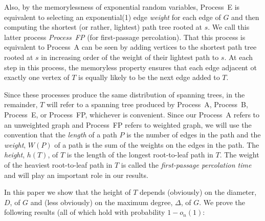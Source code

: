 \documentclass[lotsofwhite]{patmorin}
\begin{document}
Also, by the memorylessness of exponential random variables, Process~E
is equivalent to selecting an exponential(1) edge \emph{weight} for each edge
of $G$ and then computing the shortest (or rather, lightest) path
tree rooted at $s$.  We call this latter process \emph{Process~FP}
(for first-passage percolation).  That this process is equivalent to
Process~A can be seen by adding vertices to the shortest path tree rooted
at $s$ in increasing order of the weight of their lightest path to $s$.
At each step in this process, the memoryless property ensures that each
edge adjacent ot exactly one vertex of $T$ is equally likely to be the
next edge added to $T$.  

Since these processes produce the same distribution of spanning trees,
in the remainder, $T$ will refer to a spanning tree produced by Process~A,
Process~B, Process~E, or Process~FP, whichever is convenient.  Since our
Process~A refers to an unweighted graph and Process~FP refers to weighted
graph, we will use the convention that the \emph{length} of a path $P$ is
the number of edges in the path and the \emph{weight}, $W(P)$ of a path
is the sum of the weights on the edges in the path. The \emph{height},
$h(T)$, of $T$ is the length of the longest root-to-leaf path in $T$.
The weight of the heaviest root-to-leaf path in $T$ is called the
\emph{first-passage percolation time} and will play an important role
in our results.

In this paper we show that the height of $T$ depends (obviously) on
the diameter, $D$, of $G$ and (less obviously) on the maximum degree,
$\Delta$, of $G$.  We prove the following results (all of which hold
with probability $1-o_n(1)$:
\end{document}
